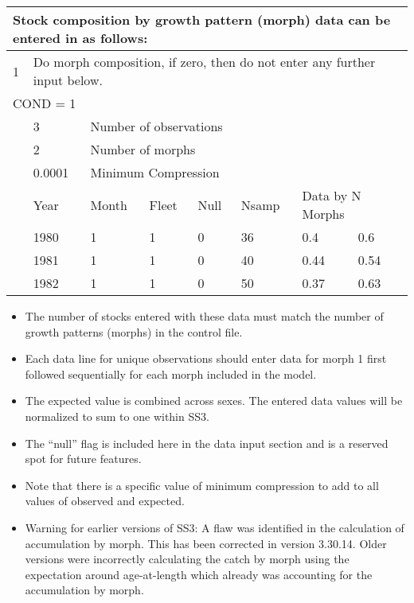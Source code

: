 \begin{center}
	\begin{tabular}{p{1.1cm} p{1.1cm} p{1.1cm} p{1.1cm} p{1.1cm} p{1.1cm} p{1.1cm} p{3.5cm}}
		\multicolumn{8}{l}{Stock composition by growth pattern (morph) data can be entered in as follows:}\\
		\hline
		1 &  \multicolumn{7}{l}{Do morph composition, if zero, then do not enter any further input below.}\Tstrut\Bstrut\\
		\hline
		\multicolumn{8}{l}{COND = 1}\Tstrut\\ 
		& 3 & \multicolumn{6}{l}{Number of observations}\Bstrut\\
		\hline
		& 2 & \multicolumn{6}{l}{Number of morphs}\Tstrut\Bstrut\\
		\hline
		& 0.0001 & \multicolumn{6}{l}{Minimum Compression}\Tstrut\Bstrut\\
		\hline
		& Year & Month & Fleet & Null & Nsamp & \multicolumn{2}{l}{Data by N Morphs} \Tstrut\Bstrut\\
		\hline
		& 1980 & 1 & 1 & 0 & 36 & 0.4 & 0.6 \Tstrut\\
		& 1981 & 1 & 1 & 0 & 40 & 0.44 & 0.54 \\
		& 1982 & 1 & 1 & 0 & 50 & 0.37 & 0.63 \Bstrut\\
		\hline
	\end{tabular}
\end{center}

	\begin{itemize}
		\item The number of stocks entered with these data must match the number of growth patterns (morphs) in the control file.
		\item Each data line for unique observations should enter data for morph 1 first followed sequentially for each morph included in the model.
		\item The expected value is combined across sexes. The entered data values will be normalized to sum to one within SS3.
		\item The ``null'' flag is included here in the data input section and is a reserved spot for future features. 
		\item Note that there is a specific value of minimum compression to add to all values of observed and expected.
		\item Warning for earlier versions of SS3: A flaw was identified in the calculation of accumulation by morph. This has been corrected in version 3.30.14.  Older versions were incorrectly calculating the catch by morph using the expectation around age-at-length which already was accounting for the accumulation by morph.   
	\end{itemize}

